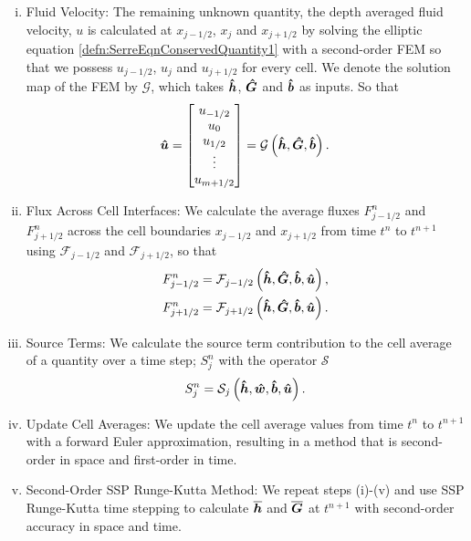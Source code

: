 \begin{enumerate}[(i)]
	\item Fluid Velocity: The remaining unknown quantity, the depth averaged fluid velocity, $u$ is calculated at $x_{j-1/2}$, $x_j$ and $x_{j+1/2}$ by solving the elliptic equation \eqref{defn:SerreEqnConservedQuantity1} with a second-order FEM so that we possess $u_{j-1/2}$, $u_j$ and $u_{j+1/2}$ for every cell. We denote the solution map of the FEM by $\mathcal{G}$, which takes $\boldsymbol{\hat{h}}$, $\boldsymbol{\hat{G}}$ and $\boldsymbol{\hat{b}}$ as inputs. So that
	\begin{equation*}
	\boldsymbol{\hat{u}} = 
	\begin{bmatrix}
	u_{-1/2} \\ u_0 \\ u_{1/2} \\ \vdots \\ u_{m+1/2}
	\end{bmatrix} = \mathcal{G}\left( \boldsymbol{\hat{h}}, \boldsymbol{\hat{G}},\boldsymbol{\hat{b}} \right).
	\end{equation*}
	\item Flux Across Cell Interfaces: We calculate the average fluxes $F^n_{j-1/2}$ and $F^n_{j+1/2}$ across the cell boundaries $x_{j-1/2}$ and $x_{j+1/2}$ from time $t^n$ to $t^{n+1}$ using $\mathcal{F}_{j-1/2}$ and $\mathcal{F}_{j+1/2}$, so that
		\begin{align*}	
		F^n_{j-1/2} &=\mathcal{F}_{j-1/2} \left( \boldsymbol{\hat{h}}, \boldsymbol{\hat{G}},\boldsymbol{\hat{b}}, \boldsymbol{\hat{u}}  \right),\\
		F^n_{j+1/2} &=\mathcal{F}_{j+1/2} \left(\boldsymbol{\hat{h}}, \boldsymbol{\hat{G}},\boldsymbol{\hat{b}}, \boldsymbol{\hat{u}}  \right).
		\end{align*}
	\item Source Terms: We calculate the source term contribution to the cell average of a quantity over a time step; $S^n_{j}$ with the operator $\mathcal{S}$
	\begin{equation*}	
	S^n_{j} =\mathcal{S}_{j} \left( \boldsymbol{\hat{h}},\boldsymbol{\hat{w}},\boldsymbol{\hat{b}}, \boldsymbol{\hat{u}}  \right).
	\end{equation*}
	\item Update Cell Averages: We update the cell average values from time $t^n$ to $t^{n+1}$ with a forward Euler approximation, resulting in a method that is second-order in space and first-order in time.
	\item Second-Order SSP Runge-Kutta Method: We repeat steps (i)-(v) and use SSP Runge-Kutta time stepping to calculate $\overline{\boldsymbol{h}}$ and $\overline{\boldsymbol{G}}$ at $t^{n+1}$ with second-order accuracy in space and time.
\end{enumerate}


